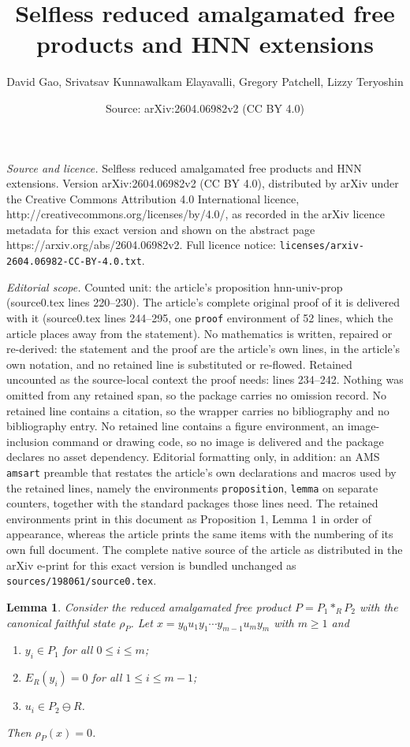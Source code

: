 \documentclass[10pt,a4paper]{amsart}
\title{Selfless reduced amalgamated free products and HNN extensions}
\author{David Gao, Srivatsav Kunnawalkam Elayavalli, Gregory Patchell, Lizzy Teryoshin}
\date{Source: arXiv:2604.06982v2 (CC BY 4.0)}
\newtheorem{lemma}{Lemma}
\begin{document}
\maketitle

\noindent\emph{Source and licence.} Selfless reduced amalgamated free products and HNN extensions. Version arXiv:2604.06982v2 (CC BY 4.0), distributed by arXiv under the Creative Commons Attribution 4.0 International licence, http://creativecommons.org/licenses/by/4.0/, as recorded in the arXiv licence metadata for this exact version and shown on the abstract page https://arxiv.org/abs/2604.06982v2. Full licence notice: \texttt{licenses/arxiv-2604.06982-CC-BY-4.0.txt}.\par\smallskip

\noindent\textit{Editorial scope.} Counted unit: the article's proposition hnn-univ-prop (source0.tex lines 220--230). The article's complete original proof of it is delivered with it (source0.tex lines 244--295, one \texttt{proof} environment of 52 lines, which the article places away from the statement). No mathematics is written, repaired or re-derived: the statement and the proof are the article's own lines, in the article's own notation, and no retained line is substituted or re-flowed.  Retained uncounted as the source-local context the proof needs: lines 234--242.  Nothing was omitted from any retained span, so the package carries no omission record.  No retained line contains a citation, so the wrapper carries no bibliography and no bibliography entry.  No retained line contains a figure environment, an image-inclusion command or drawing code, so no image is delivered and the package declares no asset dependency.  Editorial formatting only, in addition: an AMS \texttt{amsart} preamble that restates the article's own declarations and macros used by the retained lines, namely the environments \texttt{proposition}, \texttt{lemma} on separate counters, together with the standard packages those lines need.  The retained environments print in this document as Proposition 1, Lemma 1 in order of appearance, whereas the article prints the same items with the numbering of its own full document.  The complete native source of the article as distributed in the arXiv e-print for this exact version is bundled unchanged as \texttt{sources/198061/source0.tex}.
\begin{lemma}\label{lem: amal-free-state-zero}
    Consider the reduced amalgamated free product $P = P_1 \ast_R P_2$ with the canonical faithful state $\rho_P$. Let $x = y_0u_1y_1 \cdots y_{m-1}u_my_m$ with $m \ge 1$ and
    \begin{enumerate}
        \item $y_i \in P_1$ for all $0 \le i \le m$;
        \item $E_R(y_i) = 0$ for all $1 \le i \le m - 1$;
        \item $u_i \in P_2 \ominus R$.
    \end{enumerate}
    Then $\rho_P(x) = 0$.
\end{lemma}
\end{document}
